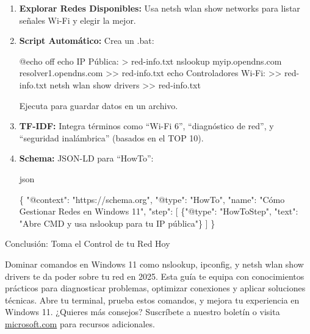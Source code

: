\documentclass[
  doc,
  floatsintext,
  longtable,
  a4paper,
  nolmodern,
  notxfonts,
  notimes,
  colorlinks=true,linkcolor=blue,citecolor=blue,urlcolor=blue]{apa7}
\newenvironment{Shaded}{\begin{snugshade}}{\end{snugshade}}
\newcommand{\DataTypeTok}[1]{\textcolor[rgb]{0.68,0.00,0.00}{#1}}
\newcommand{\FunctionTok}[1]{\textcolor[rgb]{0.28,0.35,0.67}{#1}}
\newcommand{\NormalTok}[1]{\textcolor[rgb]{0.00,0.23,0.31}{#1}}
\newcommand{\OtherTok}[1]{\textcolor[rgb]{0.00,0.23,0.31}{#1}}
\newcommand{\StringTok}[1]{\textcolor[rgb]{0.13,0.47,0.30}{#1}}
\begin{document}
\begin{enumerate}
\def\labelenumi{\arabic{enumi}.}
\item
  \textbf{Explorar Redes Disponibles:} Usa netsh wlan show networks para
  listar señales Wi-Fi y elegir la mejor.
\item
  \textbf{Script Automático:} Crea un .bat:

\begin{Shaded}
\begin{Highlighting}[]
\NormalTok{@echo off}
\NormalTok{echo IP Pública: \textgreater{} red{-}info.txt}
\NormalTok{nslookup myip.opendns.com resolver1.opendns.com \textgreater{}\textgreater{} red{-}info.txt}
\NormalTok{echo Controladores Wi{-}Fi: \textgreater{}\textgreater{} red{-}info.txt}
\NormalTok{netsh wlan show drivers \textgreater{}\textgreater{} red{-}info.txt}
\end{Highlighting}
\end{Shaded}

  Ejecuta para guardar datos en un archivo.
\item
  \textbf{TF-IDF:} Integra términos como ``Wi-Fi 6'', ``diagnóstico de
  red'', y ``seguridad inalámbrica'' (basados en el TOP 10).
\item
  \textbf{Schema:} JSON-LD para ``HowTo'':

  json

\begin{Shaded}
\begin{Highlighting}[]
\FunctionTok{\{}
  \DataTypeTok{"@context"}\FunctionTok{:} \StringTok{"https://schema.org"}\FunctionTok{,}
  \DataTypeTok{"@type"}\FunctionTok{:} \StringTok{"HowTo"}\FunctionTok{,}
  \DataTypeTok{"name"}\FunctionTok{:} \StringTok{"Cómo Gestionar Redes en Windows 11"}\FunctionTok{,}
  \DataTypeTok{"step"}\FunctionTok{:} \OtherTok{[}
    \FunctionTok{\{}\DataTypeTok{"@type"}\FunctionTok{:} \StringTok{"HowToStep"}\FunctionTok{,} \DataTypeTok{"text"}\FunctionTok{:} \StringTok{"Abre CMD y usa nslookup para tu IP pública"}\FunctionTok{\}}
  \OtherTok{]}
\FunctionTok{\}}
\end{Highlighting}
\end{Shaded}
\end{enumerate}

Conclusión: Toma el Control de tu Red Hoy

Dominar comandos en Windows 11 como nslookup, ipconfig, y netsh wlan
show drivers te da poder sobre tu red en 2025. Esta guía te equipa con
conocimientos prácticos para diagnosticar problemas, optimizar
conexiones y aplicar soluciones técnicas. Abre tu terminal, prueba estos
comandos, y mejora tu experiencia en Windows 11. ¿Quieres más consejos?
Suscríbete a nuestro boletín o visita
\href{https://microsoft.com/}{microsoft.com} para recursos adicionales.
\end{document}
